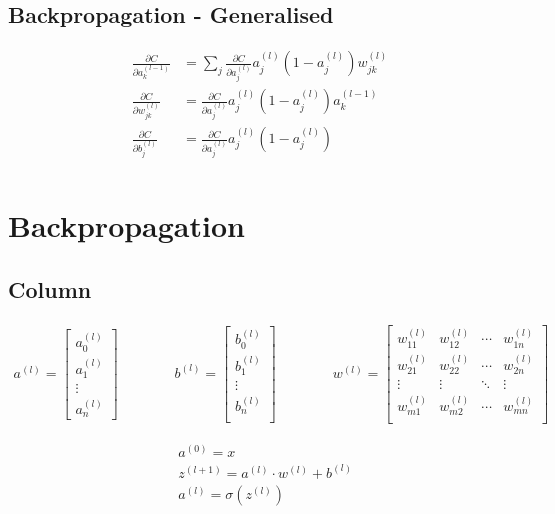 \documentclass{article}
\begin{document}
\subsection{Backpropagation - Generalised}

\begin{align*}
\frac{\partial C}{\partial a^{(l - 1)}_k} &= \sum _j \frac{\partial C}{\partial a^{(l)}_j} a^{(l)}_j (1 - a^{(l)}_j) w^{(l)}_{jk}\\
\frac{\partial C}{\partial w^{(l)}_{jk}} &= \frac{\partial C}{\partial a^{(l)}_j} a^{(l)}_j (1 - a^{(l)}_j) a^{(l - 1)}_k\\
\frac{\partial C}{\partial b^{(l)}_j} &= \frac{\partial C}{\partial a^{(l)}_j} a^{(l)}_j (1 - a^{(l)}_j)\\
\end{align*}

\section{Backpropagation}

\subsection{Column}

\begin{align*}
a^{(l)} =
\begin{bmatrix}
a^{(l)}_0\\
a^{(l)}_1\\
\vdots\\
a^{(l)}_n
\end{bmatrix}
%
\qquad \qquad
%
b^{(l)} = 
\begin{bmatrix}
b^{(l)}_0\\
b^{(l)}_1\\
\vdots\\
b^{(l)}_n\\
\end{bmatrix}
%
\qquad \qquad
%
w^{(l)} = 
\begin{bmatrix}
w^{(l)}_{11} & w^{(l)}_{12} & \cdots & w^{(l)}_{1n}\\
w^{(l)}_{21} & w^{(l)}_{22} & \cdots & w^{(l)}_{2n}\\
\vdots & \vdots & \ddots & \vdots\\
w^{(l)}_{m1} & w^{(l)}_{m2} & \cdots & w^{(l)}_{mn}\\
\end{bmatrix}
\end{align*}

\begin{align*}
&a^{(0)} = x\\
&z^{(l + 1)} = a^{(l)} \cdot w^{(l)} + b^{(l)}\\
&a^{(l)} = \sigma(z^{(l)})
\end{align*}
\end{document}
